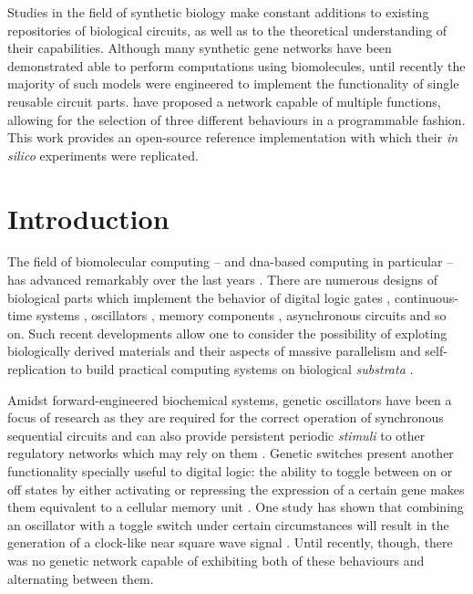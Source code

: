 
  \noindent Studies in the field of synthetic biology make constant additions to existing repositories of biological circuits, as well as to the theoretical understanding of their capabilities.
  Although many synthetic gene networks have been demonstrated able to perform computations using biomolecules, until recently the majority of such models were engineered to implement the functionality of single reusable circuit parts.
  \citet{multif} have proposed a network capable of multiple functions, allowing for the selection of three different behaviours in a programmable fashion.
  This work provides an open-source reference implementation with which their \textit{in silico} experiments were replicated.


\section{Introduction}

  The field of biomolecular computing -- and \acs{dna}-based computing in particular -- has advanced remarkably over the last years \cite{history}.
  There are numerous designs of biological parts which implement the behavior of digital logic gates \cite{reconfgate}, continuous-time systems \cite{analog}, oscillators \cite{repressilator}, memory components \cite{register}, asynchronous circuits \cite{async} and so on.
  Such recent developments allow one to consider the possibility of exploting biologically derived materials and their aspects of massive parallelism and self-replication to build practical computing systems on biological \textit{substrata} \cite{youtuber}.

  Amidst forward-engineered biochemical systems, genetic oscillators have been a focus of research \cite{optoscillator} as they are required for the correct operation of synchronous sequential circuits and can also provide persistent periodic \textit{stimuli} to other regulatory networks which may rely on them \cite{bioapps}.
  Genetic switches present another functionality specially useful \cite{bioapps} to digital logic: the ability to toggle between on or off states by either activating or repressing the expression of a certain gene makes them equivalent to a cellular memory unit \cite{youtuber}.
  One study has shown that combining an oscillator with a toggle switch under certain circumstances will result in the generation of a clock-like near square wave signal \cite{clock}.
  Until recently, though, there was no genetic network capable of exhibiting both of these behaviours and alternating between them.

